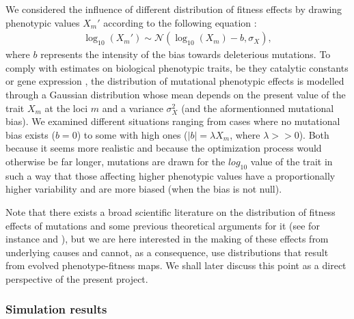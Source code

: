 We considered the influence of different distribution of fitness effects by drawing phenotypic values $X_m'$ according to the following equation :
\begin{align}
\log_{10}(X_m') \sim \mathcal{N}(\log_{10}(X_m)-b,\sigma_X),
\end{align}
where $b$ represents the intensity of the bias towards deleterious mutations. To comply with estimates on biological phenotypic traits, be they catalytic constants \citep{Carlin16} or gene expression \citep{Metzger16,Hodgins-Davis19}, the distribution of mutational phenotypic effects is modelled through a Gaussian distribution whose mean depends on the present value of the trait $X_m$ at the loci $m$ and a variance $\sigma_X^2$ (and the aformentionned mutational bias). We examined different situations ranging from cases where no mutational bias exists ($b=0$) to some with high ones ($|b|=\lambda X_m$, where $\lambda>>0$). Both because it seems more realistic \citep{Carlin16} and because the optimization process would otherwise be far longer, mutations are drawn for the $log_{10}$ value of the trait in such a way that those affecting higher phenotypic values have a proportionally higher variability and are more biased (when the bias is not null).

Note that there exists a broad scientific literature on the distribution of fitness effects of mutations \citep{Keightley07,Orr03,Gillespie84} and some previous theoretical arguments for it (see for instance \cite{Martin06} and \cite{Rice15}), but we are here interested in the making of these effects from underlying causes and cannot, as a consequence, use distributions that result from evolved phenotype-fitness maps. We shall later discuss this point as a direct perspective of the present project.

\subsubsection{Simulation results}

